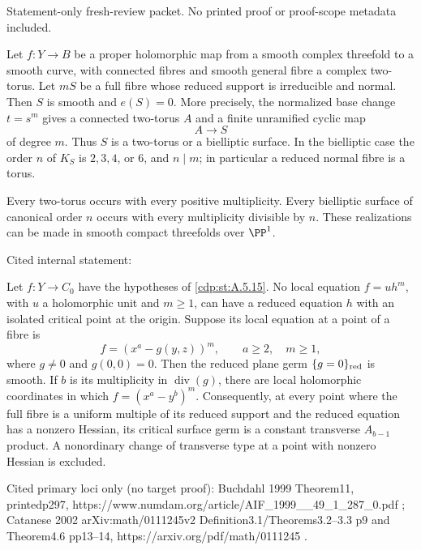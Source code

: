 Statement-only fresh-review packet. No printed proof or proof-scope metadata included.

\begin{proposition}\label{cdp:st:C.2.UN.5}


Let $f:Y\to B$ be a proper holomorphic map from a smooth
complex threefold to a smooth curve, with connected fibres
and smooth general fibre a complex two-torus. Let $mS$ be
a full fibre whose reduced support is irreducible and normal.
Then $S$ is smooth and $e(S)=0$. More precisely, the
normalized base change $t=s^m$ gives a connected two-torus
$A$ and a finite unramified cyclic map
\[
                         A\longrightarrow S
\]
of degree $m$. Thus $S$ is a two-torus or a bielliptic
surface. In the bielliptic case the order $n$ of $K_S$ is
$2,3,4$, or $6$, and $n\mid m$; in particular a reduced
normal fibre is a torus.

Every two-torus occurs with every positive multiplicity.
Every bielliptic surface of canonical order $n$ occurs
with every multiplicity divisible by $n$. These
realizations can be made in smooth compact threefolds
over $\PP^1$.
\end{proposition}

Cited internal statement:
\begin{proposition}\label{cdp:st:A.5.17}


Let $f:Y\to C_0$ have the hypotheses of \ref{cdp:st:A.5.15}.
No local equation $f=u h^m$, with $u$ a holomorphic
unit and $m\ge1$, can have a reduced equation $h$
with an isolated critical point at the origin.
Suppose its local equation at a point of a fibre is
\[
             f=(x^a-g(y,z))^m,
             \qquad a\ge2,\quad m\ge1,             \tag{A.J.38}\label{cdp:eq:A.J.38}
\]
where $g\ne0$ and $g(0,0)=0$. Then the reduced
plane germ $\{g=0\}_{\rm red}$ is smooth. If
$b$ is its multiplicity in $\operatorname{div}(g)$,
there are local holomorphic coordinates in which
$f=(x^a-y^b)^m$.
Consequently, at every point where the full fibre
is a uniform multiple of its reduced support and
the reduced equation has a nonzero Hessian, its
critical surface germ is a constant
transverse $A_{b-1}$ product. A nonordinary change
of transverse type at a point with nonzero Hessian
is excluded.
\end{proposition}

Cited primary loci only (no target proof): Buchdahl 1999 Theorem11, printedp297, https://www.numdam.org/article/AIF_1999__49_1_287_0.pdf ; Catanese 2002 arXiv:math/0111245v2 Definition3.1/Theorems3.2--3.3 p9 and Theorem4.6 pp13--14, https://arxiv.org/pdf/math/0111245 .
